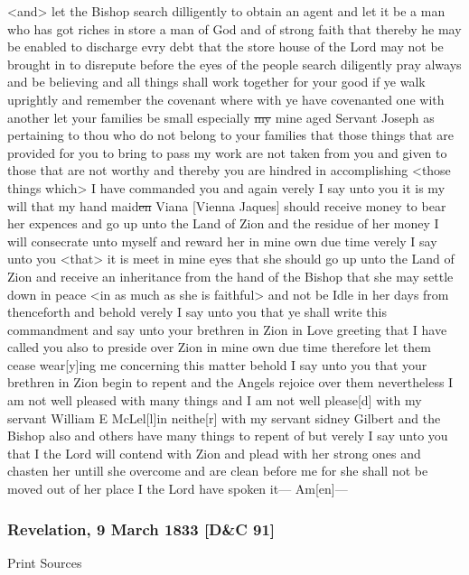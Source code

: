 <and> let the Bishop search dilligently to obtain an agent and let it be a man who has got riches in store a man of God and of strong faith that thereby he may be enabled to discharge evry debt that the store house of the Lord may not be brought in to disrepute before the eyes of the people search diligently pray always and be believing and all things shall work together for your good if ye walk uprightly and remember the covenant where with ye have covenanted one with another let your families be small especially \sout{my} mine aged Servant Joseph as pertaining to thou who do not belong to your families that those things that are provided for you to bring to pass my work are not taken from you and given to those that are not worthy and thereby you are hindred in accomplishing <those things which> I have commanded you and again verely I say unto you it is my will that my hand maid\sout{en} Viana [Vienna Jaques] should receive money to bear her expences and go up unto the Land of Zion and the residue of her money I will consecrate unto myself and reward her in mine own due time verely I say unto you <that> it is meet in mine eyes that she should go up unto the Land of Zion and receive an inheritance from the hand of the Bishop that she may settle down in peace <in as much as she is faithful> and not be Idle in her days from thenceforth and behold verely I say unto you that ye shall write this commandment and say unto your brethren in Zion in Love greeting that I have called you also to preside over Zion in mine own due time therefore let them cease wear[y]ing me concerning this matter behold I say unto you that your brethren in Zion begin to repent and the Angels rejoice over them nevertheless I am not well pleased with many things and I am not well please[d] with my servant William E McLel[l]in neithe[r] with my servant sidney Gilbert and the Bishop also and others have many things to repent of but verely I say unto you that I the Lord will contend with Zion and plead with her strong ones and chasten her untill she overcome and are clean before me for she shall not be moved out of her place I the Lord have spoken it--- Am[en]---
				
		\subsubsection{Revelation, 9 March 1833 [D\&C 91]}
			\label{EMS-1833-JS-9-MAR-1833}
		
			\begin{description}
				\item[Print Sources]
			\end{description}

